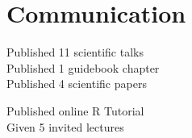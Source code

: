 \documentclass[]{deedy-resume-openfont}
\begin{document}
\begin{minipage}[t]{0.33\textwidth}
\section{Communication}
\textbullet{} Published 11 scientific talks \\
\textbullet{} Published 1 guidebook chapter \\
\textbullet{} Published 4 scientific papers\\
\sectionsep

\textbullet{} Published online R Tutorial \\
\textbullet{} Given 5 invited lectures \\
\sectionsep 

%
%

\end{minipage} 
\hfill
\end{document}
